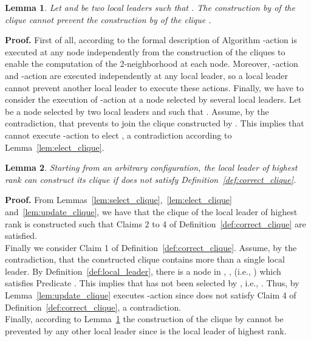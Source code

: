 \documentclass[11pt,letterpaper,onecolumn]{article}
\newtheorem{lemma}{Lemma}
\newenvironment{proof}{\noindent \begin{rm}{\textbf{Proof.} }}{\hspace*{\fill}\par\end{rm} \vspace{.3cm}}
\begin{document}
\begin{lemma}
\label{lem:construct_prio}
Let  and  be two local leaders such that . The construction by  of the clique  cannot prevent the construction by  of the clique .
\end{lemma}

\begin{proof}
First of all, according to the formal description of Algorithm  -action is executed at any node independently from the construction of the cliques to enable the computation of the 2-neighborhood at each node. Moreover, -action and -action are executed independently at any local leader, so a local leader cannot prevent another local leader to execute these actions. Finally, we have to consider the execution of -action at a node selected by several local leaders. Let  be a node selected by two local leaders  and  such that . Assume, by the contradiction, that  prevents  to join the clique  constructed by . This implies that  cannot execute -action to elect , a contradiction according to Lemma~\ref{lem:elect_clique}.
\end{proof}

\begin{lemma}
\label{lem:construct_clique_prio}
Starting from an arbitrary configuration, the local leader  of highest rank can construct its clique  if  does not satisfy Definition~\ref{def:correct_clique}.
\end{lemma}

\begin{proof}
From Lemmas~\ref{lem:select_clique},~\ref{lem:elect_clique} and~\ref{lem:update_clique}, we have that the clique  of the local leader  of highest rank is constructed such that Claims 2 to 4 of Definition~\ref{def:correct_clique} are satisfied.\\
Finally we consider Claim 1 of Definition~\ref{def:correct_clique}. Assume, by the contradiction, that the constructed clique  contains more than a single local leader. By Definition~\ref{def:local_leader}, there is a node  in , , (i.e., ) which satisfies Predicate . This implies that  has not been selected by , i.e., . Thus, by Lemma~\ref{lem:update_clique}  executes -action since  does not satisfy Claim 4 of Definition~\ref{def:correct_clique}, a contradiction.\\
Finally, according to Lemma~\ref{lem:construct_prio} the construction of the clique  by  cannot be prevented by any other local leader since  is the local leader of highest rank.
\end{proof}
\end{document}
